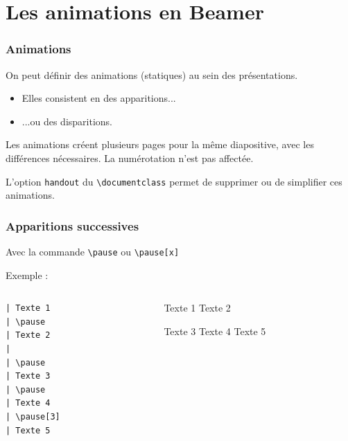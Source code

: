 \section{Les animations en Beamer}

\begin{frame}[fragile]
  \frametitle{Animations}

On peut définir des animations (statiques) au sein des présentations.
\begin{itemize}
  \item<2,4-> Elles consistent en des apparitions...
  \item<3-> ...ou des disparitions.
\end{itemize}

\bigskip
\pause[4]
Les animations créent plusieurs pages pour la même diapositive, avec les différences nécessaires. La numérotation n'est pas affectée.

\medskip
L'option \lstinline?handout? du \lstinline?\documentclass? permet de supprimer ou de simplifier ces animations.
\end{frame}



\begin{frame}[fragile]
  \frametitle{Apparitions successives}

Avec la commande \lstinline?\pause? ou \lstinline?\pause[x]?

\medskip
Exemple :

\begin{columns}
  \begin{column}{0.20\textwidth}
\begin{lstlisting}
| Texte 1
| \pause
| Texte 2
| 
| \pause
| Texte 3
| \pause
| Texte 4
| \pause[3]
| Texte 5
\end{lstlisting}
  \end{column}
  \begin{column}{0.35\textwidth}
\rmfamily
Texte 1
\pause{}
Texte 2

\pause
Texte 3
\pause{}
Texte 4
\pause[3]
Texte 5
  \end{column}
\end{columns}
\end{frame}



